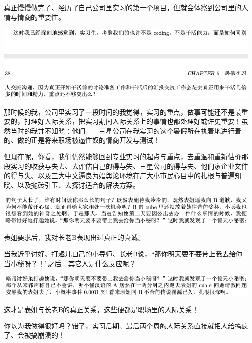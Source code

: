 \documentclass[9pt, b5paper]{article}
\begin{document}
真正慢慢做完了、经历了自己公司里实习的第一个项目，但就会体察到公司里的人情与情商的重要性。 

\begin{center}
\includegraphics[width=.9\linewidth]{./pic/backups_plans_20210507_091150.png}
\end{center}

那时候的我，公司里实习了一段时间的我觉得，实习的重点，做事可能还不是最重要的，打理好人际关系，把实习期间人际关系上的事情也都处理好或许更重要！虽然当时的我并不知晓：他们——三星公司在我实习的这个暑假所在执着地进行着的、做的正是将来职场被逼性奴的情商开发与测试！

但现在呢，你看，我们仍然能够回到专业实习的起点与重点，去重温和重新估价那段实习的收获与失去、去评估自己的得与失、三星公司的得与失、他们家企业文件的得与失、以及三大中文逼良为娼舆论环境在广大小市民心目中的扎根与普遍知晓、以及抛砖引玉、去探讨适合的解决方案。

\begin{center}
\includegraphics[width=.9\linewidth]{./pic/backups_plans_20210507_093408.png}
\end{center}

表姐要求后，我对长老B表现出过真正的真诚。

当我近乎讨好、打趣儿自己的小导师、长老B说，“那你明天要不要带上我去给你当小秘呀？！”之后，其它人是什么反应呢？

\begin{center}
\includegraphics[width=.9\linewidth]{./pic/backups_plans_20210507_093537.png}
\end{center}

这才是表姐与长老B的真正关系，这些便都是职场里的人际关系！

你以为我做得很好吗？错了，实习后期、最后两个周的人际关系直接就把人给搞疯了、会被搞崩溃的！
\end{document}
